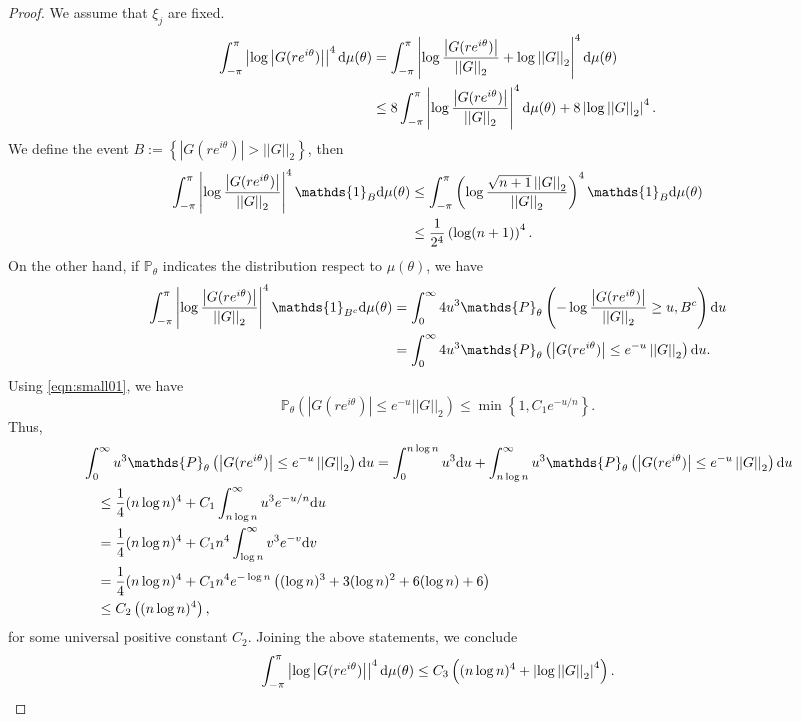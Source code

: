 \documentclass[12pt]{amsart}
\theoremstyle{plain}
\numberwithin{equation}{section}
\newcommand{\<}{\langle}
\renewcommand{\>}{\rangle}
\newcommand{\PP}[1]{\left(#1\right)}
\newcommand{\LL}[1]{\left\{#1\right\}}
\newcommand{\dd}{\textnormal{d}}
\newcommand{\abs}[1]{\left|#1\right|}
\newcommand{\norm}[1]{\left|\left|#1\right|\right|}
\begin{document}
\begin{proof}
We assume that $\xi_j$ are fixed.
\begin{align*}
 \int_{-\pi}^{\pi} \abs{\log\abs{G(re^{i\theta})}}^4 \dd\mu(\theta) & = \int_{-\pi}^{\pi} \abs{\log\frac{\abs{G(re^{i\theta})}}{\norm{G}_2} + \log \norm{G}_2 }^4 \dd\mu(\theta) \\
 & \leq 8  \int_{-\pi}^{\pi} \abs{\log\frac{\abs{G(re^{i\theta})}}{\norm{G}_2}}^4 \dd\mu(\theta) + 8 \abs{\log\norm{G}_2}^4.
\end{align*}
We define the event $B:=\LL{ \abs{G(re^{i\theta})} > \norm{G}_2 }$, then
\begin{align*}
\int_{-\pi}^{\pi} \abs{\log\frac{\abs{G(re^{i\theta})}}{\norm{G}_2}}^4 \mathds{1}_B \dd\mu(\theta) & \leq \int_{-\pi}^{\pi} \PP{\log\frac{\sqrt{n+1} \norm{G}_2}{\norm{G}_2}}^4 \mathds{1}_B \dd\mu(\theta) \\
& \leq \frac{1}{2^4} \PP{\log(n+1)}^4.
\end{align*}
On the other hand, if $\mathds{P}_{\theta}$ indicates the distribution respect to $\mu(\theta)$, we have
\begin{align*}
\int_{-\pi}^{\pi} \abs{\log\frac{\abs{G(re^{i\theta})}}{\norm{G}_2}}^4 \mathds{1}_{B^c} \dd\mu(\theta) & = \int_{0}^{\infty} 4 u^3 \mathds{P}_{\theta}\PP{-\log\frac{\abs{G(re^{i\theta})}}{\norm{G}_2} \geq u, B^c } \dd u \\
& = \int_{0}^{\infty} 4 u^3 \mathds{P}_{\theta}\PP{ \abs{G(re^{i\theta})} \leq e^{-u}\norm{G}_2 } \dd u.
\end{align*}
Using \ref{eqn:small01}, we have
\[
\mathds{P}_{\theta}\PP{ \abs{G(re^{i\theta})} \leq e^{-u}\norm{G}_2 } \leq \min\LL{1,C_1 e^{-u/n}}.
\]
Thus,
\begin{align*}
& \int_{0}^{\infty} u^3 \mathds{P}_{\theta}\PP{ \abs{G(re^{i\theta})} \leq e^{-u}\norm{G}_2 } \dd u  = \int_{0}^{n\log n} u^3  \dd u + \int_{n\log n}^{\infty} u^3 \mathds{P}_{\theta}\PP{ \abs{G(re^{i\theta})} \leq e^{-u}\norm{G}_2 } \dd u \\
& \quad \leq  \frac{1}{4}(n\log n)^4 + C_1\int_{n\log n}^{\infty} u^3 e^{-u/n} \dd u \\
& \quad =  \frac{1}{4}(n\log n)^4 + C_1 n^4 \int_{\log n}^{\infty} v^3 e^{-v} \dd v \\
& \quad = \frac{1}{4}(n\log n)^4 + C_1 n^4 e^{-\log n}\PP{(\log n)^3 + 3(\log n)^2 + 6(\log n)+6} \\
& \quad \leq C_2\PP{ (n\log n)^4},
\end{align*}
for some universal positive constant $C_2$. Joining the above statements, we conclude
\[
 \int_{-\pi}^{\pi} \abs{\log\abs{G(re^{i\theta})}}^4 \dd\mu(\theta) \leq C_3 \PP{ (n\log n)^4 + \abs{\log\norm{G}_2}^4}.
\]
\end{proof}
\end{document}
